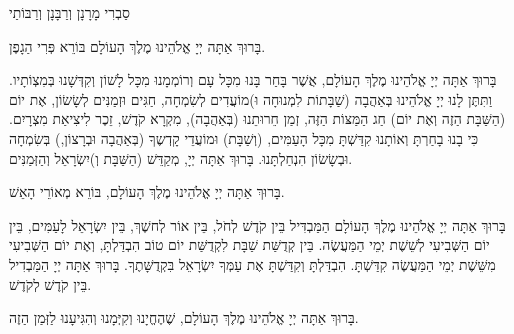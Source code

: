 

\begin{framed}

\end{framed}

סַבְרִי מָרָנָן וְרַבָּנָן וְרַבּוֹתַי

בָּרוּךְ אַתָּה יְיָ אֱלֹהֵינוּ מֶלֶךְ הָעוֹלָם בּוֹרֵא פְּרִי הַגָפֶן.


בָּרוּךְ אַתָּה יְיָ אֱלֹהֵינוּ מֶלֶךְ הָעוֹלָם, אֲשֶׁר בָּחַר בָּנוּ מִכָּל עָם וְרוֹמְמָנוּ מִכָּל לָשׁוֹן וְקִדְּשָׁנוּ בְּמִצְוֹתָיו. וַתִּתֶּן לָנוּ יְיָ אֱלֹהֵינוּ בְּאַהֲבָה (שַׁבָּתוֹת לִמְנוּחָה וּ)מוֹעֲדִים לְשִׂמְחָה, חַגִּים וּזְמַנִּים לְשָׂשׂוֹן, אֶת יוֹם (הַשַּׁבָּת הַזֶה וְאֶת יוֹם) חַג הַמַּצּוֹת הַזֶּה, זְמַן חֵרוּתֵנוּ (בְּאַהֲבָה), מִקְרָא קֹדֶשׁ, זֵכֶר לִיצִיאַת מִצְרָיִם. כִּי בָנוּ בָחַרְתָּ וְאוֹתָנוּ קִדַּשְׁתָּ מִכָּל הָעַמִּים, (וְשַׁבָּת) וּמוֹעֲדֵי קָדְשֶךָ (בְּאַהֲבָה וּבְרָצוֹן,) בְּשִׂמְחָה וּבְשָׂשׂוֹן הִנְחַלְתָּנוּ. בָּרוּךְ אַתָּה יְיָ, מְקַדֵּשׁ (הַשַּׁבָּת וְ)יִשְׂרָאֵל וְהַזְּמַנִּים.

\begin{framed}

בָּרוּךְ אַתָּה יְיָ אֱלֹהֵינוּ מֶלֶךְ הָעוֹלָם, בּוֹרֵא מְאוֹרֵי הָאֵשׁ.

בָּרוּךְ אַתָּה יְיָ אֱלֹהֵינוּ מֶלֶךְ הָעוֹלָם הַמַּבְדִּיל בֵּין קֹדֶשׁ לְחֹל, בֵּין אוֹר לְחשֶׁךְ, בֵּין יִשְׂרָאֵל לָעַמִּים, בֵּין יוֹם הַשְּׁבִיעִי לְשֵׁשֶׁת יְמֵי הַמַּעֲשֶׂה. בֵּין קְדֻשַּׁת שַׁבָּת לִקְדֻשַּׁת יוֹם טוֹב הִבְדַּלְתָּ, וְאֶת יוֹם הַשְּׁבִיעִי מִשֵּׁשֶׁת יְמֵי הַמַּעֲשֶׂה קִדַּשְׁתָּ. הִבְדַּלְתָּ וְקִדַּשְׁתָּ אֶת עַמְּךָ יִשְׂרָאֵל בִּקְדֻשָּׁתֶךָ. בָּרוּךְ אַתָּה יְיָ הַמַּבְדִיל בֵּין קֹדֶשׁ לְקֹדֶשׁ.
\end{framed}

בָּרוּךְ אַתָּה יְיָ אֱלֹהֵינוּ מֶלֶךְ הָעוֹלָם, שֶׁהֶחֱיָנוּ וְקִיְּמָנוּ וְהִגִּיעָנוּ לַזְּמַן הַזֶה.

